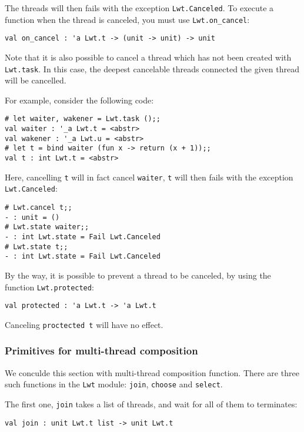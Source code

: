 \documentclass{article}
\newcommand{\lwt}{\texttt{Lwt}\xspace}
\begin{document}
The threads will then fails with the exception
\texttt{Lwt.Canceled}. To execute a function when the thread is
canceled, you must use \texttt{Lwt.on\_cancel}:

\begin{verbatim}
val on_cancel : 'a Lwt.t -> (unit -> unit) -> unit
\end{verbatim}

Note that it is also possible to cancel a thread which has not been
created with \texttt{Lwt.task}. In this case, the deepest cancelable
threads connected the given thread will be cancelled.

For example, consider the following code:

\begin{verbatim}
# let waiter, wakener = Lwt.task ();;
val waiter : '_a Lwt.t = <abstr>
val wakener : '_a Lwt.u = <abstr>
# let t = bind waiter (fun x -> return (x + 1));;
val t : int Lwt.t = <abstr>
\end{verbatim}

Here, cancelling \texttt{t} will in fact cancel \texttt{waiter},
\texttt{t} will then fails with the exception \texttt{Lwt.Canceled}:

\begin{verbatim}
# Lwt.cancel t;;
- : unit = ()
# Lwt.state waiter;;
- : int Lwt.state = Fail Lwt.Canceled
# Lwt.state t;;
- : int Lwt.state = Fail Lwt.Canceled
\end{verbatim}

By the way, it is possible to prevent a thread to be canceled, by
using the function \texttt{Lwt.protected}:

\begin{verbatim}
val protected : 'a Lwt.t -> 'a Lwt.t
\end{verbatim}

Canceling \texttt{proctected t} will have no effect.

\subsubsection{Primitives for multi-thread composition}

We conculde this section with multi-thread composition function. There
are three such functions in the \lwt module: \texttt{join},
\texttt{choose} and \texttt{select}.

The first one, \texttt{join} takes a list of threads, and wait for all
of them to terminates:

\begin{verbatim}
val join : unit Lwt.t list -> unit Lwt.t
\end{verbatim}
\end{document}
